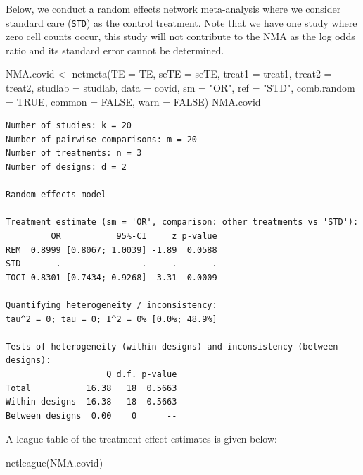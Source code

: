 \documentclass[
  letterpaper,
  DIV=11,
  numbers=noendperiod]{scrreprt}
\newenvironment{Shaded}{\begin{snugshade}}{\end{snugshade}}
\newcommand{\AttributeTok}[1]{\textcolor[rgb]{0.40,0.45,0.13}{#1}}
\newcommand{\ConstantTok}[1]{\textcolor[rgb]{0.56,0.35,0.01}{#1}}
\newcommand{\FunctionTok}[1]{\textcolor[rgb]{0.28,0.35,0.67}{#1}}
\newcommand{\NormalTok}[1]{\textcolor[rgb]{0.00,0.23,0.31}{#1}}
\newcommand{\OtherTok}[1]{\textcolor[rgb]{0.00,0.23,0.31}{#1}}
\newcommand{\StringTok}[1]{\textcolor[rgb]{0.13,0.47,0.30}{#1}}
\begin{document}
Below, we conduct a random effects network meta-analysis where we
consider standard care (\texttt{STD}) as the control treatment. Note
that we have one study where zero cell counts occur, this study will not
contribute to the NMA as the log odds ratio and its standard error
cannot be determined.

\begin{Shaded}
\begin{Highlighting}[]
\NormalTok{NMA.covid }\OtherTok{\textless{}{-}} \FunctionTok{netmeta}\NormalTok{(}\AttributeTok{TE =}\NormalTok{ TE, }\AttributeTok{seTE =}\NormalTok{ seTE, }\AttributeTok{treat1 =}\NormalTok{ treat1, }\AttributeTok{treat2 =}\NormalTok{ treat2,}
                     \AttributeTok{studlab =}\NormalTok{ studlab, }\AttributeTok{data =}\NormalTok{ covid, }\AttributeTok{sm =} \StringTok{"OR"}\NormalTok{, }\AttributeTok{ref =} \StringTok{"STD"}\NormalTok{,}
                     \AttributeTok{comb.random =} \ConstantTok{TRUE}\NormalTok{, }\AttributeTok{common =} \ConstantTok{FALSE}\NormalTok{, }\AttributeTok{warn =} \ConstantTok{FALSE}\NormalTok{)}
\NormalTok{NMA.covid }
\end{Highlighting}
\end{Shaded}

\begin{verbatim}
Number of studies: k = 20
Number of pairwise comparisons: m = 20
Number of treatments: n = 3
Number of designs: d = 2

Random effects model

Treatment estimate (sm = 'OR', comparison: other treatments vs 'STD'):
         OR           95%-CI     z p-value
REM  0.8999 [0.8067; 1.0039] -1.89  0.0588
STD       .                .     .       .
TOCI 0.8301 [0.7434; 0.9268] -3.31  0.0009

Quantifying heterogeneity / inconsistency:
tau^2 = 0; tau = 0; I^2 = 0% [0.0%; 48.9%]

Tests of heterogeneity (within designs) and inconsistency (between designs):
                    Q d.f. p-value
Total           16.38   18  0.5663
Within designs  16.38   18  0.5663
Between designs  0.00    0      --
\end{verbatim}

A league table of the treatment effect estimates is given below:

\begin{Shaded}
\begin{Highlighting}[]
\FunctionTok{netleague}\NormalTok{(NMA.covid)}
\end{Highlighting}
\end{Shaded}
\end{document}
